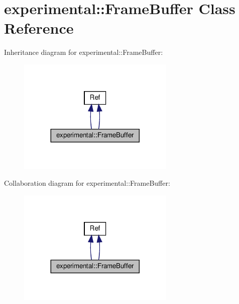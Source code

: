 \hypertarget{classexperimental_1_1FrameBuffer}{}\section{experimental\+:\+:Frame\+Buffer Class Reference}
\label{classexperimental_1_1FrameBuffer}


Inheritance diagram for experimental\+:\+:Frame\+Buffer\+:
\nopagebreak
\begin{figure}[H]
\begin{center}
\leavevmode
\includegraphics[width=212pt]{classexperimental_1_1FrameBuffer__inherit__graph}
\end{center}
\end{figure}


Collaboration diagram for experimental\+:\+:Frame\+Buffer\+:
\nopagebreak
\begin{figure}[H]
\begin{center}
\leavevmode
\includegraphics[width=212pt]{classexperimental_1_1FrameBuffer__coll__graph}
\end{center}
\end{figure}
